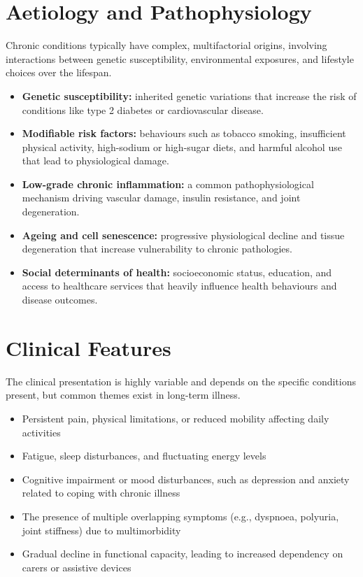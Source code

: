 \section*{Aetiology and Pathophysiology}
Chronic conditions typically have complex, multifactorial origins, involving interactions between genetic susceptibility, environmental exposures, and lifestyle choices over the lifespan.
\begin{itemize}
    \item \textbf{Genetic susceptibility:} inherited genetic variations that increase the risk of conditions like type 2 diabetes or cardiovascular disease.
    \item \textbf{Modifiable risk factors:} behaviours such as tobacco smoking, insufficient physical activity, high-sodium or high-sugar diets, and harmful alcohol use that lead to physiological damage.
    \item \textbf{Low-grade chronic inflammation:} a common pathophysiological mechanism driving vascular damage, insulin resistance, and joint degeneration.
    \item \textbf{Ageing and cell senescence:} progressive physiological decline and tissue degeneration that increase vulnerability to chronic pathologies.
    \item \textbf{Social determinants of health:} socioeconomic status, education, and access to healthcare services that heavily influence health behaviours and disease outcomes.
\end{itemize}

\section*{Clinical Features}
The clinical presentation is highly variable and depends on the specific conditions present, but common themes exist in long-term illness.
\begin{itemize}
    \item Persistent pain, physical limitations, or reduced mobility affecting daily activities
    \item Fatigue, sleep disturbances, and fluctuating energy levels
    \item Cognitive impairment or mood disturbances, such as depression and anxiety related to coping with chronic illness
    \item The presence of multiple overlapping symptoms (e.g., dyspnoea, polyuria, joint stiffness) due to multimorbidity
    \item Gradual decline in functional capacity, leading to increased dependency on carers or assistive devices
\end{itemize}

